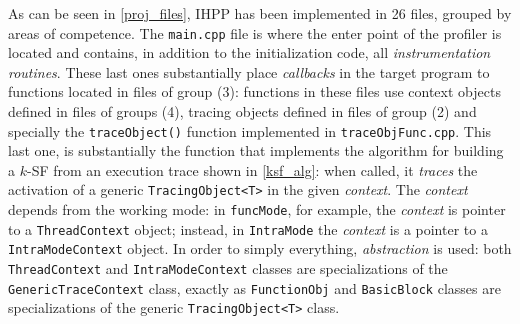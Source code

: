 \documentclass[a4paper,10pt]{report}
\begin{document}
As can be seen in \cref{proj_files}, IHPP has been implemented in 26 files,
grouped by areas of competence. The \verb|main.cpp| file is where the enter point
 of the profiler is located and contains, in addition to the initialization code, all \emph{instrumentation routines}. These last ones substantially place \emph{callbacks}
in the target program to functions located in files of group (3): functions in these
files use context objects defined in files of groups (4), 
tracing objects defined in files of group (2) and specially
the \verb|traceObject()| function implemented in \verb|traceObjFunc.cpp|.
This last one, is substantially the function that implements the algorithm for building
a $k$-SF from an execution trace shown in \cref{ksf_alg}: 
when called, it \emph{traces} the activation of a generic \verb|TracingObject<T>| 
in the given \emph{context}. The \emph{context} depends from the working mode:
in \verb|funcMode|, for example, the \emph{context} is pointer to a \verb|ThreadContext| object; instead, in \verb|IntraMode| the \emph{context} is 
a pointer to a \verb|IntraModeContext| object. In order to simply everything, 
\emph{abstraction} is used: 
both \verb|ThreadContext| and \verb|IntraModeContext| classes
are specializations of
the \verb|GenericTraceContext| class, exactly as \verb|FunctionObj| and 
\verb|BasicBlock| classes are specializations of the generic \verb|TracingObject<T>| class.
\end{document}
